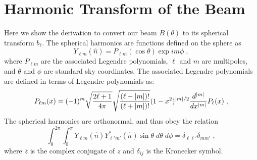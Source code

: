 \chapter{Harmonic Transform of the Beam} %
\label{app:trans} 

Here we show the derivation to convert our beam $B(\theta)$ to its spherical transform $b_\ell$. The spherical harmonics are functions defined on the sphere as
\begin{equation}
    Y_{\ell m}(\hat{n}) = P_{\ell m}(\cos\theta)\exp{i m\phi} \; ,
\end{equation}
where $P_{\ell m}$ are the associated Legendre polynomials, $\ell$ and $m$ are multipoles, and $\theta$ and $\phi$ are standard sky coordinates. The associated Legendre polynomials are defined in terms of Legendre polynomials as:
\begin{equation}
    P_{\ell m}(x) = (-1)^m\sqrt{\frac{2\ell+1}{4\pi}}\sqrt{\frac{(\ell-\abs{m})!}{(\ell+\abs{m})!}}(1-x^2)^{\abs{m}/2}\frac{d^{\abs{m}}}{dx^{\abs{m}}}P_\ell(x) \; ,
\end{equation}  
The spherical harmonics are orthonormal, and thus obey the relation
\begin{equation}
    \int_0^{2\pi}\int_0^{\pi} Y_{\ell m}(\hat{n})Y_{\ell'm'}^{*}(\hat{n}) \sin\theta \; d\theta\; d\phi = \delta_{\ell\ell'}\delta_{mm'} \; ,
\end{equation}
where $\overline{z}$ is the complex conjugate of $z$ and $\delta_{ij}$ is the Kronecker symbol.

